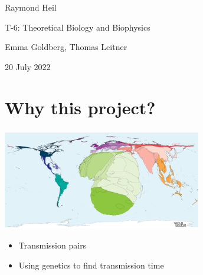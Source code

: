 \documentclass[aspectratio=169]{beamer}
\begin{document}
\begin{frame}

    \begin{center}

        \vfill

        Raymond Heil

        T-6: Theoretical Biology and Biophysics

        Emma Goldberg, Thomas Leitner

        \vfill

        \scriptsize{20 July 2022}

    \end{center}


\end{frame}

\section{Why this project?}

\begin{frame} \frametitle{\insertsection}

    \centering\includegraphics[width=0.65\textwidth]{images/hiv-cartogram}
    
    \begin{itemize}
        \item{Transmission pairs}
        \item{Using genetics to find transmission time}
    \end{itemize}


\end{frame}
\end{document}
